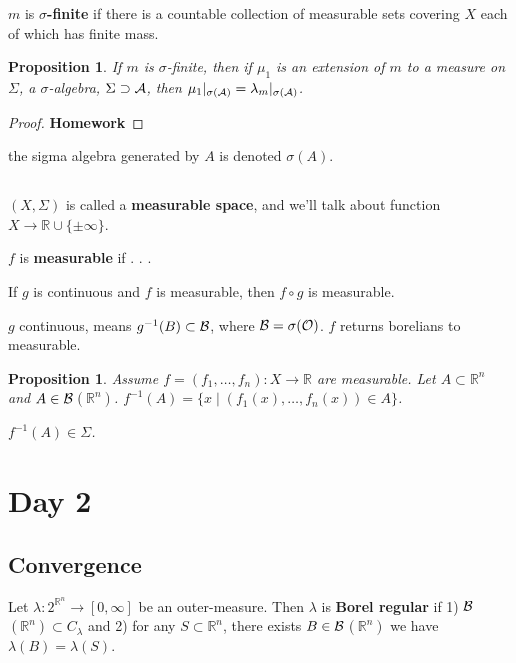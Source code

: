 \documentclass[11pt]{article}
\newtheorem{prop}[thm]{Proposition}
\newenvironment{defn}[1][Definition]{\begin{trivlist}
\item[\hskip \labelsep {\bfseries #1}]}{\end{trivlist}}
\newcommand{\ld}{\ldots}
\newcommand{\ra}{\rightarrow}
\newcommand{\sbs}{\subset}
\newcommand{\sps}{\supset}
\newcommand{\si}{\sigma}
\newcommand{\Si}{\Sigma}
\newcommand{\la}{\lambda}
\newcommand{\re}{\mathbb{R}}
\begin{document}
\begin{defn}
$m$ is {\bf $\si$-finite} if there is a countable collection of measurable sets covering $X$ each of which has finite mass.
\end{defn}

\begin{prop}
If $m$ is $\si$-finite, then if $\mu_1$ is an extension of $m$ to a measure on $\Sigma$, a $\si$-algebra, $\Sigma\sps\cal{A}$, then $\mu_1|_{\si(\cal{A})}=\la_m|_{\si(\cal{A})}$.
\end{prop}
\begin{proof}
{\bf Homework}
\end{proof}

\begin{defn}
the sigma algebra generated by $A$ is denoted $\si(A)$. 
\end{defn}

\subsection{}

$(X,\Si)$ is called a {\bf measurable space}, and we'll talk about function $X\ra\re\cup\{\pm\infty\}$.

$f$ is {\bf measurable} if . . . 

If $g$ is continuous and $f$ is measurable, then $f\circ g$ is measurable.

$g$ continuous, means $g^{-1}(B)\sbs\cal{B}$, where $\cal{B}=\si(\cal{O})$. $f$ returns borelians to measurable.

\begin{prop}
Assume $f=(f_1,\ld,f_n):X\ra\re$ are measurable. Let $A\sbs\re^n$ and $A\in\cal{B}$$(\re^n)$. $f^{-1}(A)=\{x\mid (f_1(x),\ld,f_n(x))\in A\}$. 

$f^{-1}(A)\in\Sigma$.
\end{prop}

\section{Day 2}

\subsection{Convergence}

\begin{defn}
Let $\la:2^{\re^n}\ra[0,\infty]$ be an outer-measure. Then $\la$ is {\bf Borel regular} if 1) $\cal{B}$$(\re^n)\sbs C_{\la}$ and 2) for any $S\sbs \re^n$, there exists $B\in\cal{B}$$(\re^n)$  we have $\la(B)=\la(S)$. 
\end{defn}
\end{document}
